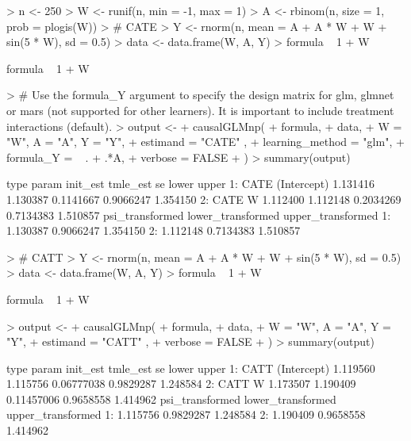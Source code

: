 \documentclass{article}
\begin{document}
\begin{Schunk}
\begin{Sinput}
> n <- 250
> W <- runif(n, min = -1,  max = 1)
> A <- rbinom(n, size = 1, prob = plogis(W))
> # CATE
> Y <- rnorm(n, mean = A + A * W + W + sin(5 * W), sd = 0.5)
> data <- data.frame(W, A, Y)
> formula ~ 1 + W
\end{Sinput}
\begin{Soutput}
formula ~ 1 + W
\end{Soutput}
\begin{Sinput}
> # Use the formula_Y argument to specify the design matrix for glm, glmnet or mars (not supported for other learners). It is important to include treatment interactions (default).
> output <-
+   causalGLMnp(
+     formula,
+     data,
+     W = "W", A = "A", Y = "Y",
+     estimand = "CATE" ,
+     learning_method = "glm",
+     formula_Y = ~ . + .*A,
+     verbose = FALSE
+   )
> summary(output)
\end{Sinput}
\begin{Soutput}
   type       param init_est tmle_est        se     lower    upper
1: CATE (Intercept) 1.131416 1.130387 0.1141667 0.9066247 1.354150
2: CATE           W 1.112400 1.112148 0.2034269 0.7134383 1.510857
   psi_transformed lower_transformed upper_transformed
1:        1.130387         0.9066247          1.354150
2:        1.112148         0.7134383          1.510857
\end{Soutput}
\begin{Sinput}
> # CATT
> Y <- rnorm(n, mean = A + A * W + W + sin(5 * W), sd = 0.5)
> data <- data.frame(W, A, Y)
> formula ~ 1 + W
\end{Sinput}
\begin{Soutput}
formula ~ 1 + W
\end{Soutput}
\begin{Sinput}
> output <-
+   causalGLMnp(
+     formula,
+     data,
+     W = "W", A = "A", Y = "Y",
+     estimand = "CATT" ,
+     verbose = FALSE
+   )
> summary(output)
\end{Sinput}
\begin{Soutput}
   type       param init_est tmle_est         se     lower    upper
1: CATT (Intercept) 1.119560 1.115756 0.06777038 0.9829287 1.248584
2: CATT           W 1.173507 1.190409 0.11457006 0.9658558 1.414962
   psi_transformed lower_transformed upper_transformed
1:        1.115756         0.9829287          1.248584
2:        1.190409         0.9658558          1.414962
\end{Soutput}
\begin{Sinput}

\end{Sinput}
\end{Schunk}
\end{document}
